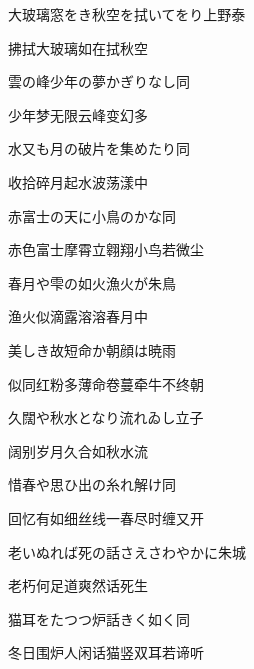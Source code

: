 \begin{haiku}
    {\FH 大玻璃窓をき秋空を拭いてをり}\hfill{\FH 上野泰}

    {\FK 拂拭大玻璃如在拭秋空}
\end{haiku}

\begin{haiku}
    {\FH 雲の峰少年の夢かぎりなし}\hfill{\FH 同}

    {\FK 少年梦无限云峰变幻多}
\end{haiku}

\begin{haiku}
    {\FH 水又も月の破片を集めたり}\hfill{\FH 同}

    {\FK 收拾碎月起水波荡漾中}
\end{haiku}

\begin{haiku}
    {\FH 赤富士の天に小鳥のかな}\hfill{\FH 同}

    {\FK 赤色富士摩霄立翱翔小鸟若微尘}
\end{haiku}

\begin{haiku}
    {\FH 春月や雫の如火漁火が}\hfill{\FH 朱鳥}

    {\FK 渔火似滴露溶溶春月中}
\end{haiku}

\begin{haiku}
    {\FH 美しき故短命か朝顔は}\hfill{\FH 暁雨}

    {\FK 似同红粉多薄命卷蔓牵牛不终朝}
\end{haiku}

\begin{haiku}
    {\FH 久闊や秋水となり流れゐし}\hfill{\FH 立子}

    {\FK 阔别岁月久合如秋水流}
\end{haiku}

\begin{haiku}
    {\FH 惜春や思ひ出の糸れ解け}\hfill{\FH 同}

    {\FK 回忆有如细丝线一春尽时缠又开}
\end{haiku}

\begin{haiku}
    {\FH 老いぬれば死の話さえさわやかに}\hfill{\FH 朱城}

    {\FK 老朽何足道爽然话死生}
\end{haiku}

\begin{haiku}
    {\FH 猫耳をたつつ炉話きく如く}\hfill{\FH 同}

    {\FK 冬日围炉人闲话猫竖双耳若谛听}
\end{haiku}

